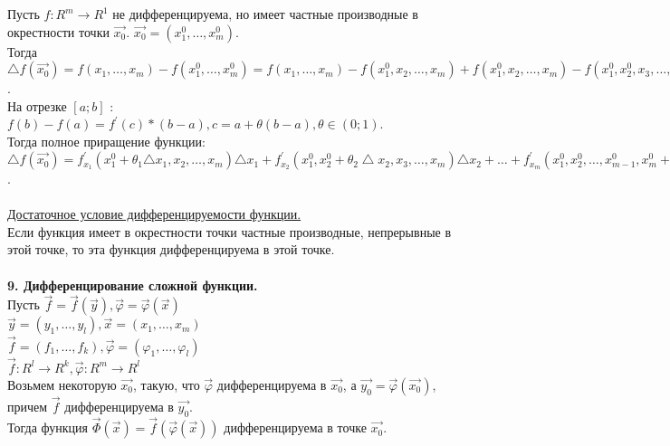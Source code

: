 \documentclass[12pt]{article}
\begin{document}
Пусть $f : R^m \to R^1$ не дифференцируема, но имеет частные производные в окрестности точки $\overrightarrow{x_0}$. $\overrightarrow{x_0} = (x_1^0,\dots,x_m^0)$.\\
Тогда $\bigtriangleup f(\overrightarrow{x_0}) = f(x_1,\dots,x_m)-f(x_1^0,\dots,x_m^0) = f(x_1,\dots,x_m)-f(x_1^0,x_2,\dots,x_m)+f(x_1^0,x_2,\dots,x_m)-f(x_1^0,x_2^0,x_3,\dots,x_m)+f(x_1^0,x_2^0,x_3,\dots,x_m)-\dots+f(x_1^0,x_2^0,x_3^0,\dots,x_{m-1}^0,x_m)-f(x_1^0,\dots,x_m^0)$.\\
На отрезке $[a;b]$ : $f(b)-f(a)=f^{'}(c)*(b-a),c=a+\theta(b-a),\theta \in (0;1)$.\\
Тогда полное приращение функции:\\
$\bigtriangleup f(\overrightarrow{x_0})=f^{'}_{x_1}(x_1^0+\theta_1 {\bigtriangleup x_1}, x_2,\dots,x_m){\bigtriangleup x_1}+f^{'}_{x_2}(x_1^0, x_2^0+\theta_2 \bigtriangleup x_2,x_3,\dots,x_m){\bigtriangleup x_2}+\dots+f^{'}_{x_m}(x_1^0, x_2^0,\dots,x_{m-1}^0,x_m^0+\theta_m {\bigtriangleup x_m}) {\bigtriangleup x_m}$.\\
\\
\label{question8_2}\underline{Достаточное условие дифференцируемости функции.}\\
Если функция имеет в окрестности точки частные производные, непрерывные в этой точке, то эта функция дифференцируема в этой точке.\\
\\
\label{question9_1}\textbf{9. Дифференцирование сложной функции.}\\
Пусть $\overrightarrow{f} = \overrightarrow{f}(\overrightarrow{y}), \overrightarrow{\varphi}=\overrightarrow{\varphi}(\overrightarrow{x})$\\
\indent $\overrightarrow{y} = (y_1, \dots, y_l), \overrightarrow{x}=(x_1, \dots, x_m)$\\
\indent $\overrightarrow{f} = (f_1, \dots, f_k), \overrightarrow{\varphi}=(\varphi_1, \dots, \varphi_l)$\\
\indent $\overrightarrow{f} : R^l \to R^k, \overrightarrow{\varphi} : R^m \to R^l$\\
Возьмем некоторую $\overrightarrow{x_0}$, такую, что $\overrightarrow{\varphi}$ дифференцируема в $\overrightarrow{x_0}$, а $\overrightarrow{y_0} = \overrightarrow{\varphi}(\overrightarrow{x_0})$, причем $\overrightarrow{f}$ дифференцируема в $\overrightarrow{y_0}$.\\
Тогда функция $\overrightarrow{\Phi }(\overrightarrow{x}) = \overrightarrow{f}(\overrightarrow{\varphi}(\overrightarrow{x}))$ дифференцируема в точке $\overrightarrow{x_0}$.\\
\end{document}

